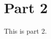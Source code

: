 \documentclass[main.tex]{subfiles}
\begin{document}
\section{Part 2}
This is part 2.
\end{document}
